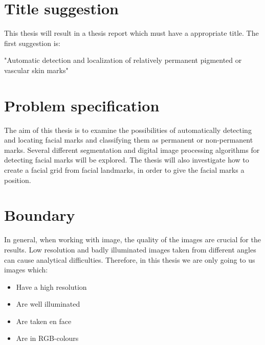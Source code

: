 \documentclass{article}
\begin{document}
\section{Title suggestion}

This thesis will result in a thesis report which must have a appropriate title. The first suggestion is: 

\begin{displayquote}
"Automatic detection and localization of relatively permanent pigmented or vascular skin marks"
\end{displayquote}

\section{Problem specification}

The aim of this thesis is to examine the possibilities of automatically detecting and locating facial marks and classifying them as permanent or non-permanent marks. Several different segmentation and digital image processing algorithms for detecting facial marks will be explored. The thesis will also investigate how to create a facial grid from facial landmarks, in order to give the facial marks a position.

\section{Boundary}

In general, when working with image, the quality of the images are crucial for the results. Low resolution and badly illuminated images taken from different angles can cause analytical difficulties. Therefore, in this thesis we are only going to us images which:

\begin{itemize}
	\item Have a high resolution
	\item Are well illuminated
	\item Are taken en face
	\item Are in RGB-colours 
\end{itemize}









\newpage


\end{document}
